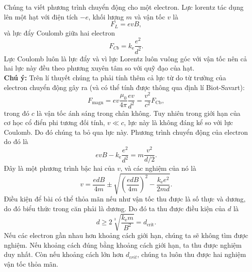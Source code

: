 \begin{loigiai}
\begin{enumerate}[1)]
\begin{center}
        \end{center}
    Chúng ta viết phương trình chuyển động cho một electron. Lực lorentz tác dụng lên một hạt với điện tích $-e$, khối lượng $m$ và vận tốc $v$ là 
    \[F_L=evB,\]
    và lực đẩy Coulomb giữa hai electron \[F_{Cb}=k_{\mathrm{e}}\dfrac{e^2}{d^2}.\]
    Lực Coulomb luôn là lực đẩy và vì lực Lorentz luôn vuông góc với vận tốc nên cả hai lực này đều theo phương xuyên tâm so với quỹ đạo của hạt. 
    \\ \textbf{Chú ý:} Trên lí thuyết chúng ta phải tính thêm cả lực từ do từ trường của electron chuyển động gây ra (và có thể tính được thông qua định lí Biot-Savart):
         \[F_{\mathrm{magn}}=e v \frac{\mu_{0}}{4 \pi} \frac{e v}{d^{2}}=\frac{v^{2}}{c^{2}} F_{\mathrm{Cb}},\]
    trong đó $c$ là vận tốc ánh sáng trong chân không. Tuy nhiên trong giới hạn của cơ học cổ điển phi tương đối tính, $v\ll c$, lực này là không đáng kể so với lực Coulomb. Do đó chúng ta bỏ qua lực này.
    Phương trình chuyển động của electron do đó là
        \[evB-k_{\mathrm{e}}\dfrac{e^2}{d^2}=m\dfrac{v^2}{d/2}.\]
    Đây là một phương trình bậc hai của $v$, và các nghiệm của nó là
        \[v=\dfrac{edB}{4m} \pm \sqrt{\left(\dfrac{edB}{4m}\right)^2-\dfrac{k_{\mathrm{e}}e^2}{2md}}.\]
    Điều kiện để bài có thể thỏa mãn nếu như vận tốc thu được là số thực và dương, do đó biểu thức trong căn phải là dương. Do đó ta thu được điều kiện của $d$ là 
        \[d \geqslant 2\sqrt[3]{{\frac{{{k_{\mathrm{e}}}m}}{{{B^2}}}}} = {d_{\mathrm{crit}}}.\]
    Nếu các electron gần nhau hơn khoảng cách giới hạn, chúng ta sẽ không tìm được nghiệm. Nếu khoảng cách đúng bằng khoảng cách giới hạn, ta thu được nghiệm duy nhất. Còn nếu khoảng cách lớn hơn $d_{crit}$, chúng ta luôn thu được hai nghiệm vận tốc thỏa mãn. 
    

\end{enumerate}
\end{loigiai}
